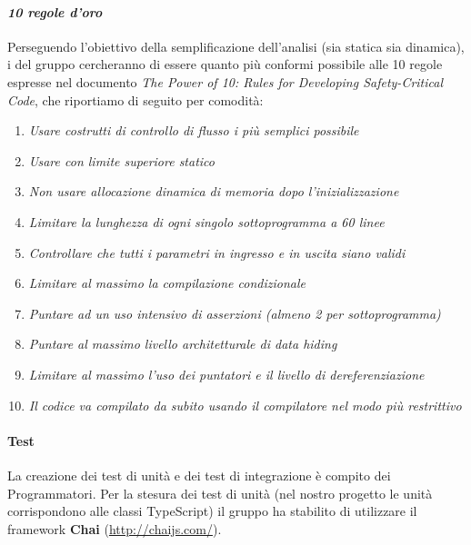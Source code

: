 		\paragraph*{\textit{10 regole d'oro}}
		Perseguendo l'obiettivo della semplificazione dell'analisi (sia statica sia dinamica),
           	i  del gruppo cercheranno di essere quanto più conformi possibile alle 10 regole
           	espresse nel documento \textit{The Power of 10: Rules for Developing Safety-Critical Code}, che riportiamo di seguito per comodità:
                	\begin{enumerate}
                        	\item \textit{Usare costrutti di controllo di flusso i più semplici possibile}
                        	\item \textit{Usare  con limite superiore statico}
                        	\item \textit{Non usare allocazione dinamica di memoria dopo l'inizializzazione}
                        	\item \textit{Limitare la lunghezza di ogni singolo sottoprogramma a 60 linee}
                        	\item \textit{Controllare che tutti i parametri in ingresso e in uscita siano validi}
                        	\item \textit{Limitare al massimo la compilazione condizionale}
                        	\item \textit{Puntare ad un uso intensivo di asserzioni (almeno 2 per sottoprogramma)}
                        	\item \textit{Puntare al massimo livello architetturale di \textit{data hiding}}
                        	\item \textit{Limitare al massimo l'uso dei puntatori e il livello di dereferenziazione}
                        	\item \textit{Il codice va compilato da subito usando il compilatore nel modo più restrittivo}
			\end{enumerate}

		\paragraph*{Test}
		La creazione dei test di unità e dei test di integrazione è compito dei Programmatori. Per la stesura dei test di unità
		(nel nostro progetto le unità corrispondono alle classi TypeScript) il gruppo ha stabilito di utilizzare il framework
	        \textbf{Chai} (\url{http://chaijs.com/}).	

